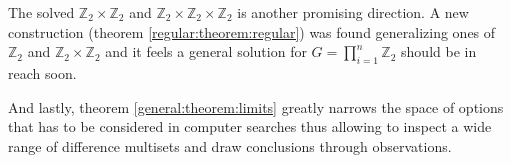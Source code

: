 \documentclass{article}
\theoremstyle{plain}
\theoremstyle{definition}
\theoremstyle{remark}
\begin{document}
		The solved $\mathbb Z_2 \times \mathbb Z_2$ and $\mathbb Z_2 \times \mathbb Z_2 \times \mathbb Z_2$ is another promising direction. A new construction (theorem \ref{regular:theorem:regular}) was found generalizing ones of $\mathbb Z_2$ and $\mathbb Z_2 \times \mathbb Z_2$ and it feels a general solution for $G=\prod_{i=1}^{n} \mathbb Z_2$ should be in reach soon.
		
		And lastly, theorem \ref{general:theorem:limits} greatly narrows the space of options that has to be considered in computer searches thus allowing to inspect a wide range of difference multisets and draw conclusions through observations.

	
	 
		
\end{document}
